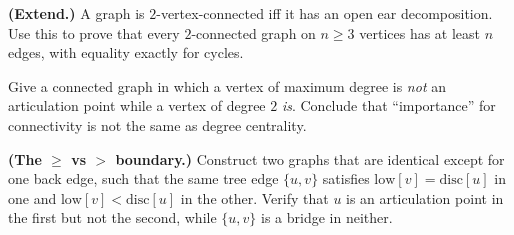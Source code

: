 \begin{exercise}
\textbf{(Extend.)} A graph is $2$-vertex-connected iff it has an open ear
decomposition. Use this to prove that every $2$-connected graph on $n\ge3$ vertices has
at least $n$ edges, with equality exactly for cycles.
\end{exercise}

\begin{exercise}
Give a connected graph in which a vertex of maximum degree is \emph{not} an articulation
point while a vertex of degree $2$ \emph{is}. Conclude that ``importance'' for
connectivity is not the same as degree centrality.
\end{exercise}

\begin{exercise}
\textbf{(The $\ge$ vs $>$ boundary.)} Construct two graphs that are identical except
for one back edge, such that the same tree edge $\{u,v\}$ satisfies
$\mathrm{low}[v]=\mathrm{disc}[u]$ in one and $\mathrm{low}[v]<\mathrm{disc}[u]$ in the
other. Verify that $u$ is an articulation point in the first but not the second, while
$\{u,v\}$ is a bridge in neither.
\end{exercise}
